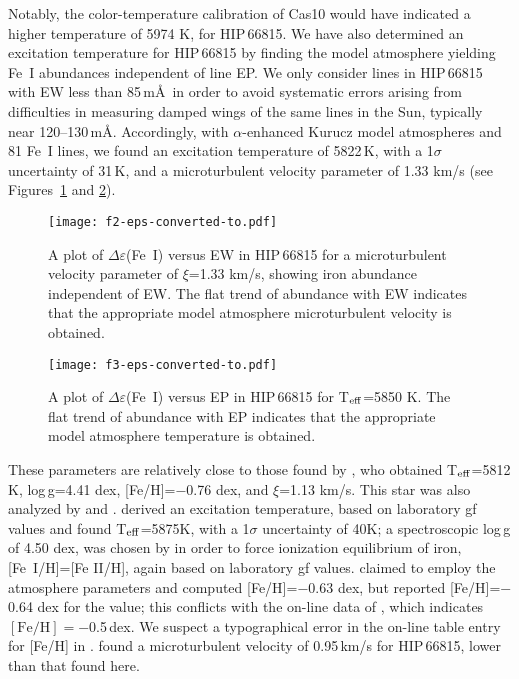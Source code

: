 \documentclass[revtex4]{emulateapj}
\begin{document}
Notably, the color-temperature calibration of Cas10 would have indicated a higher temperature of 5974 K, for HIP\,66815.  We have also determined an excitation temperature for HIP\,66815 by finding the model atmosphere yielding Fe~I abundances independent of line EP.  We only consider lines in HIP\,66815 with EW less than 85\,m\AA\ in order to avoid systematic errors arising from difficulties in measuring damped wings of the same lines in the Sun, typically near 120--130\,m\AA.  Accordingly, with $\alpha$-enhanced Kurucz model atmospheres and 81 Fe~I lines, we found an excitation temperature of 5822\,K, with a 1$\sigma$ uncertainty of 31\,K, and a microturbulent velocity parameter of 1.33 km/s (see Figures~\ref{fig:ewab66815} and \ref{fig:epab66815}).

\begin{figure*}[t]
\centering
\texttt{[image: f2-eps-converted-to.pdf]}
\caption{A plot of $\Delta\varepsilon$(Fe~I) versus EW in HIP\,66815 for a microturbulent velocity parameter of $\xi$=1.33 km/s, showing iron abundance independent of EW. The flat trend of abundance with EW indicates that the appropriate model atmosphere microturbulent velocity is obtained. \label{fig:ewab66815}}
\vspace{0.25cm}
\end{figure*}

\begin{figure*}[t]
\centering
\texttt{[image: f3-eps-converted-to.pdf]}
\caption{A plot of $\Delta\varepsilon$(Fe~I) versus EP in HIP\,66815 for T$_{\rm eff}$=5850 K.  The flat trend of abundance with EP indicates that the appropriate model atmosphere temperature is obtained. \label{fig:epab66815}}
\vspace{0.25cm}
\end{figure*}

These parameters are relatively close to those found by \citet{KM2008, KM2011}, who obtained T$_{\rm eff}$=5812 K, log\,g=4.41 dex, [Fe/H]=$-$0.76 dex, and $\xi$=1.13 km/s.  This star was also analyzed by \citet{Fulb2000} and \citet{Sobeck2006}.  \citet{Fulb2000} derived an excitation temperature, based on laboratory gf values and found T$_{\rm eff}$=5875K, with a 1$\sigma$ uncertainty of 40K; a spectroscopic log\,g of 4.50 dex, was chosen by \citet{Fulb2000} in order to force ionization equilibrium of iron, [Fe~I/H]=[Fe II/H], again based on laboratory gf values.  \citet{Sobeck2006} claimed to employ the \citet{Fulb2000} atmosphere parameters and computed [Fe/H]=$-$0.63 dex, but reported [Fe/H]=$-$0.64 dex for the \citet{Fulb2000} value; this conflicts with the on-line data of \citet{Fulb2000}, which indicates $\mathrm{[Fe/H]}=-$0.5\,dex.  We suspect a typographical error in the on-line table entry for [Fe/H] in \citet{Fulb2000}.  \citet{Fulb2000} found a microturbulent velocity of 0.95\,km/s for HIP\,66815, lower than that found here. 
\end{document}
